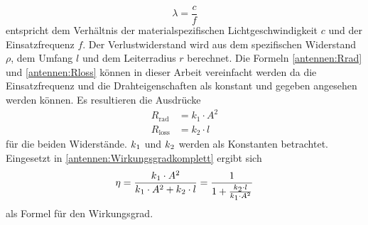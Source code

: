 \begin{equation}
	\lambda = \frac{c}{f}
	\label{antennen:lambda}
\end{equation}
entspricht dem Verhältnis der materialspezifischen Lichtgeschwindigkeit $c$ und der Einsatzfrequenz $f$.
Der Verlustwiderstand wird aus dem spezifischen Widerstand $\rho$, dem Umfang $l$ und dem Leiterradius $r$ berechnet. Die Formeln \eqref{antennen:Rrad} und \eqref{antennen:Rloss} können in dieser Arbeit vereinfacht werden da die Einsatzfrequenz und die Drahteigenschaften als konstant und gegeben angesehen werden können. Es resultieren die Ausdrücke 
\begin{align}
	R_{\text{rad}} &= k_{\text{1}} \cdot A^2 \tag{20.6} \label{antennen:Rrad_konst} \\
	R_{\text{loss}} &= k_{\text{2}} \cdot l \tag{20.7} \label{antennen:Rloss_konst}
\end{align}
für die beiden Widerstände. $k\textsubscript{1}$ und $k\textsubscript{2}$ werden als Konstanten betrachtet. Eingesetzt in \eqref{antennen:Wirkungsgradkomplett} ergibt sich
\setcounter{equation}{7}
\begin{equation}
	\eta=\frac{k\textsubscript{1}\cdot{A^2}}{k\textsubscript{1}\cdot{A^2}+{k\textsubscript{2}\cdot{l}}}=\frac{1}{1+\frac{k\textsubscript{2}\cdot{l}}{k\textsubscript{1}\cdot{A^2}}}
	\label{antennen:Wirkungsgradeingesetzt}
\end{equation}
als Formel für den Wirkungsgrad.
